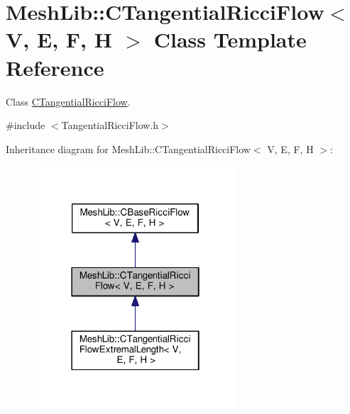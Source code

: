 \hypertarget{class_mesh_lib_1_1_c_tangential_ricci_flow}{}\section{Mesh\+Lib\+:\+:C\+Tangential\+Ricci\+Flow$<$ V, E, F, H $>$ Class Template Reference}
\label{class_mesh_lib_1_1_c_tangential_ricci_flow}


Class \hyperlink{class_mesh_lib_1_1_c_tangential_ricci_flow}{C\+Tangential\+Ricci\+Flow}.  




{\ttfamily \#include $<$Tangential\+Ricci\+Flow.\+h$>$}



Inheritance diagram for Mesh\+Lib\+:\+:C\+Tangential\+Ricci\+Flow$<$ V, E, F, H $>$\+:
\nopagebreak
\begin{figure}[H]
\begin{center}
\leavevmode
\includegraphics[width=214pt]{class_mesh_lib_1_1_c_tangential_ricci_flow__inherit__graph}
\end{center}
\end{figure}


